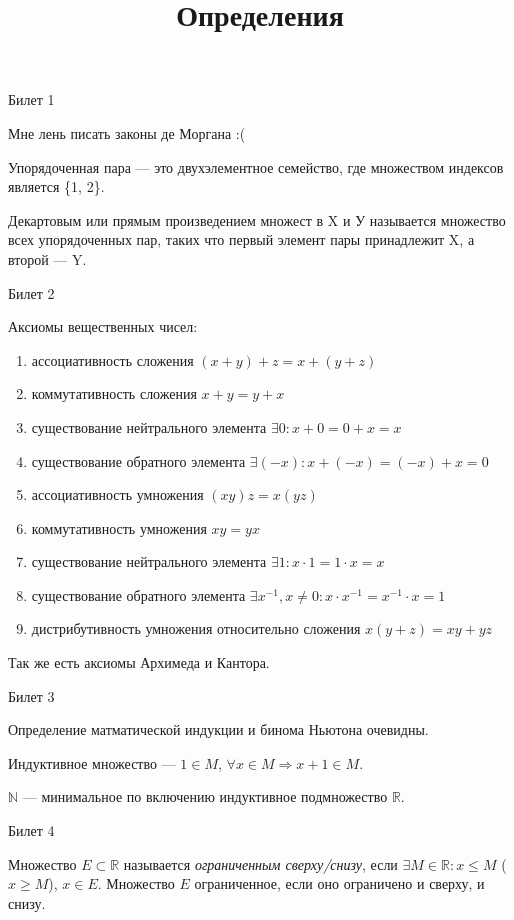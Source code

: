 \documentclass[12pt,a4paper]{article}
\title{Определения}
\begin{document}
	
\begin{center}
Билет 1
\end{center}

Мне лень писать законы де Моргана :(

Упорядоченная пара --- это двухэлементное семейство, где множеством индексов является \{1, 2\}.

Декартовым или прямым произведением множест в X и У называется множество всех упорядоченных пар, таких что первый элемент пары принадлежит X, а второй --- Y.

\begin{center}
Билет 2
\end{center}

Аксиомы вещественных чисел:
\begin{enumerate}
\item ассоциативность сложения $(x+y)+z=x+(y+z)$
\item коммутативность сложения $x+y=y+x$
\item существование нейтрального элемента $\exists 0: x+0=0+x=x$
\item существование обратного элемента $\exists (-x): x+(-x)=(-x)+x=0$
\item ассоциативность умножения $(xy)z=x(yz)$
\item коммутативность умножения $xy=yx$
\item существование нейтрального элемента $\exists 1: x \cdot 1 = 1 \cdot x = x$
\item существование обратного элемента $\exists x^{-1}, x \ne 0: x \cdot x^{-1}= x^{-1} \cdot x = 1$
\item дистрибутивность умножения относительно сложения $x(y+z)=xy+yz$
\end{enumerate}

Так же есть аксиомы Архимеда и Кантора.

\begin{center}
Билет 3
\end{center}

Определение матматической индукции и бинома Ньютона очевидны.

Индуктивное множество --- $1 \in M$, $\forall x \in M \Rightarrow x+1 \in M$.

$\mathbb{N}$ --- минимальное по включению индуктивное подмножество $\mathbb{R}$. 

\begin{center}
Билет 4
\end{center}

Множество $E \subset \mathbb{R}$ называется \textit{ограниченным сверху/снизу}, если $\exists M \in \mathbb{R}: x \leq M$ ($x \geq M$), $x \in E$. Множество $E$ ограниченное, если оно ограничено и сверху, и снизу.
\end{document}
